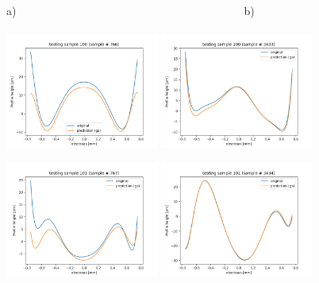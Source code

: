 \documentclass{iucr}
\begin{document}
\begin{figure}\label{fig:v12v13profiles}
    a)~~~~~~~~~~~~~~~~~~~~~~~~~~~~~~~~~~~~~~~~~b)~~~~~~~~~~~~~~~~~~\\
    \includegraphics[width=0.45\textwidth]{figures/v12p100.png}
    \includegraphics[width=0.45\textwidth]{figures/v13p100.png}

    \includegraphics[width=0.45\textwidth]{figures/v12p101.png}
    \includegraphics[width=0.45\textwidth]{figures/v13p101.png}


\end{figure}
\end{document}
